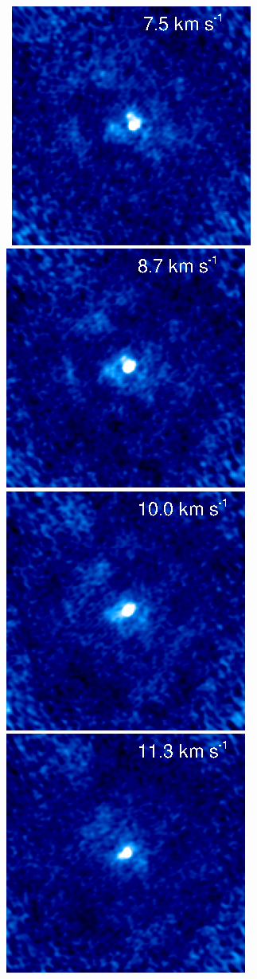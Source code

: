 \documentclass[preprint2]{aastex}
\begin{document}
\begin{figure}[hbt!]
{         }
\\
\mbox{
          \includegraphics[]{chan21.ps}
          \includegraphics[]{chan20.ps}
          \includegraphics[]{chan19.ps}
          \includegraphics[]{chan18.ps}
         }
\end{figure}
\end{document}
